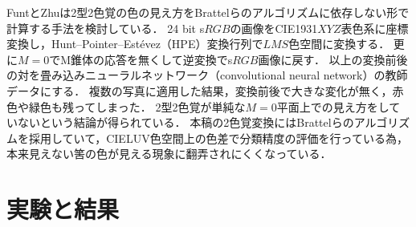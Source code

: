 \documentclass[uplatex,paper=a4,fontsize=4.0truemm,jafontsize=4.0truemm,head_space=30.0truemm,foot_space=30.0truemm,baselineskip=8.0truemm,line_length=40zw,gutter=25.0truemm,oneside,openany,fleqn,hanging_panctuation,open_bracket_pos=nibu_tentsuki,dvipdfmx,jis2004,book,titlepage]{jlreq}
\theoremstyle{mystyle}
\newcommand{\mathdisplaystyle}[1]{\(\displaystyle{#1}\)}
\begin{document}
		FuntとZhuは2型2色覚の色の見え方をBrattelらのアルゴリズムに依存しない形で計算する手法を検討している\cite{Funt2018}．
		24 bit s\mathdisplaystyle{RGB}の画像をCIE1931\mathdisplaystyle{XYZ}表色系に座標変換し，Hunt--Pointer--Estévez（HPE）変換行列で\mathdisplaystyle{LMS}色空間に変換する．
		更に\mathdisplaystyle{M=0}でM錐体の応答を無くして逆変換でs\mathdisplaystyle{RGB}画像に戻す．
		以上の変換前後の対を畳み込みニューラルネットワーク（convolutional neural network）の教師データにする．
		複数の写真に適用した結果，変換前後で大きな変化が無く，赤色や緑色も残ってしまった．
		2型2色覚が単純な\mathdisplaystyle{M=0}平面上での見え方をしていないという結論が得られている．
		本稿の2色覚変換にはBrattelらのアルゴリズムを採用していて，CIELUV色空間上の色差で分類精度の評価を行っている為，本来見えない筈の色が見える現象に翻弄されにくくなっている．
	\chapter{実験と結果}
\end{document}

